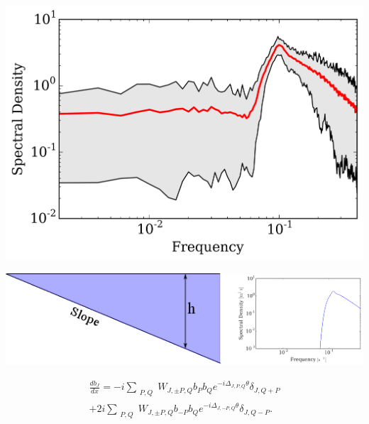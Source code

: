\documentclass{beamer}
\begin{document}




\begin{frame}[c]%
\begin{center}
\includegraphics[scale=0.8]{fig6t.png}
\end{center}
\end{frame}

\begin{frame}[c]%

\begin{center}

\vspace{0.5cm}\includegraphics[scale=0.5]{modelt.png}
\end{center}


  \begin{multline}
\frac{db_{J}}{dx}=-i\sum_{\begin{array}{c}
P,Q\end{array}}W_{J,\pm P,Q}b_{P}b_{Q}e^{-i\Delta_{J,P,Q}\theta}\delta_{J,Q+P} \\ +2i\sum_{\begin{array}{c}
P,Q\end{array}}W_{J,\pm P,Q}b_{-P}b_{Q}e^{-i\Delta_{J,-P,Q}\theta}\delta_{J,Q-P}.\label{eq: triads}
\end{multline}
\end{frame}
\end{document}

